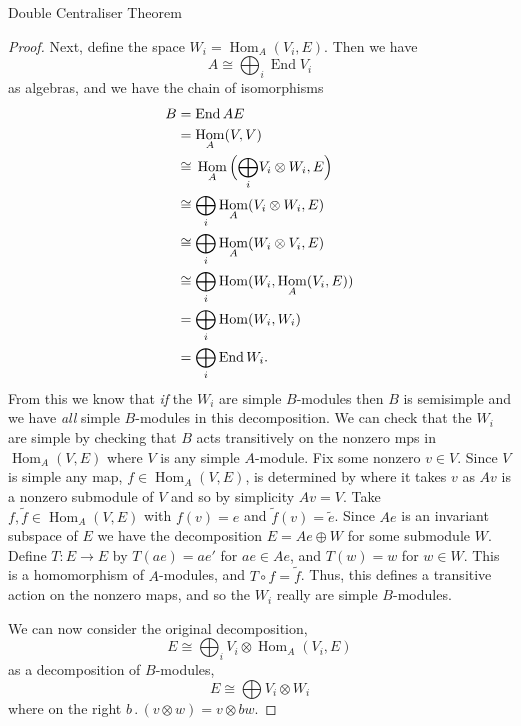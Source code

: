 \documentclass[fleqn]{NotesClass}
\DeclareMathOperator{\End}{End}
\DeclareMathOperator{\Hom}{Hom}
\newcommand{\action}{\mathbin{.}}
\newcommand{\isomorphic}{\cong}
\begin{document}
\begin{thm}{Double Centraliser Theorem}{}
\begin{proof}
            Next, define the space \(W_i = \Hom_A(V_i, E)\).
            Then we have
            \begin{equation}
                A \isomorphic \bigoplus_i \End V_i
            \end{equation}
            as algebras, and we have the chain of isomorphisms
            \begin{align}
                B &= \End A E\\
                &= \Hom_A(V, V)\\
                &\isomorphic \vphantom{\bigoplus_i}\Hom_A\left( \vphantom{\bigoplus}\smash{\bigoplus_{i}} V_i \otimes W_i, E \right)\\
                &\isomorphic \bigoplus_i \Hom_A(V_i \otimes W_i, E)\\
                &\isomorphic \bigoplus_i \Hom_A(W_i \otimes V_i, E)\\
                &\isomorphic \bigoplus_i \Hom(W_i, \Hom_A(V_i, E))\\
                &= \bigoplus_i \Hom(W_i, W_i)\\
                &= \bigoplus_i \End W_i.
            \end{align}
            From this we know that \emph{if} the \(W_i\) are simple \(B\)-modules then \(B\) is semisimple and we have \emph{all} simple \(B\)-modules in this decomposition.
            We can check that the \(W_i\) are simple by checking that \(B\) acts transitively on the nonzero mps in \(\Hom_A(V, E)\) where \(V\) is any simple \(A\)-module.
            Fix some nonzero \(v \in V\).
            Since \(V\) is simple any map, \(f \in \Hom_A(V, E)\), is determined by where it takes \(v\) as \(Av\) is a nonzero submodule of \(V\) and so by simplicity \(Av = V\).
            Take \(f, \tilde{f} \in \Hom_A(V, E)\) with \(f(v) = e\) and \(\tilde{f}(v) = \tilde{e}\).
            Since \(Ae\) is an invariant subspace of \(E\) we have the decomposition \(E = Ae \oplus W\) for some submodule \(W\).
            Define \(T \colon E \to E\) by \(T(ae) = ae'\) for \(ae \in Ae\), and \(T(w) = w\) for \(w \in W\).
            This is a homomorphism of \(A\)-modules, and \(T \circ f = \tilde{f}\).
            Thus, this defines a transitive action on the nonzero maps, and so the \(W_i\) really are simple \(B\)-modules.
            
            We can now consider the original decomposition,
            \begin{equation}
                E \isomorphic \bigoplus_i V_i \otimes \Hom_A(V_i, E)
            \end{equation}
            as a decomposition of \(B\)-modules,
            \begin{equation}
                E \isomorphic \bigoplus V_i \otimes W_i
            \end{equation}
            where on the right \(b \action (v \otimes w) = v \otimes bw\).
            

\end{proof}
\end{thm}
\end{document}
